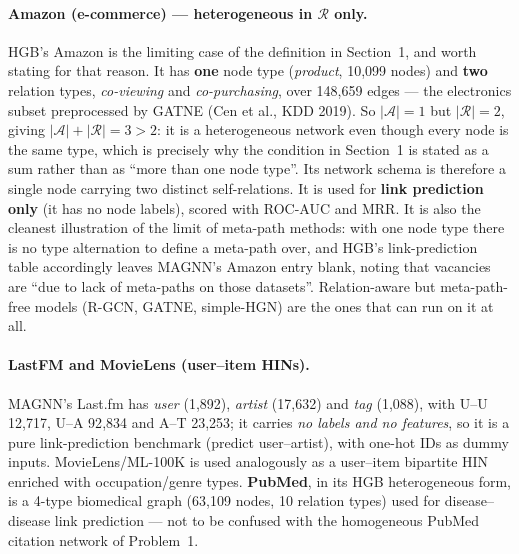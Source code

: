 \paragraph{Amazon (e-commerce) --- heterogeneous in $\mathcal{R}$ only.} HGB's Amazon is the
limiting case of the definition in Section~1, and worth stating for that reason. It has
\textbf{one} node type (\emph{product}, 10{,}099 nodes) and \textbf{two} relation types,
\emph{co-viewing} and \emph{co-purchasing}, over 148{,}659 edges --- the electronics subset
preprocessed by GATNE (Cen et al., KDD 2019). So $|\mathcal{A}|=1$ but $|\mathcal{R}|=2$, giving
$|\mathcal{A}|+|\mathcal{R}|=3>2$: it is a heterogeneous network even though every node is the
same type, which is precisely why the condition in Section~1 is stated as a sum rather than as
``more than one node type''. Its network schema is therefore a single node carrying two distinct
self-relations. It is used for \textbf{link prediction only} (it has no node labels), scored with
ROC-AUC and MRR. It is also the cleanest illustration of the limit of meta-path methods: with one
node type there is no type alternation to define a meta-path over, and HGB's link-prediction
table accordingly leaves MAGNN's Amazon entry blank, noting that vacancies are ``due to lack of
meta-paths on those datasets''. Relation-aware but meta-path-free models (R-GCN, GATNE,
simple-HGN) are the ones that can run on it at all.

\paragraph{LastFM and MovieLens (user--item HINs).} MAGNN's Last.fm has \emph{user} (1{,}892),
\emph{artist} (17{,}632) and \emph{tag} (1{,}088), with U--U 12{,}717, U--A 92{,}834 and A--T
23{,}253; it carries \emph{no labels and no features}, so it is a pure link-prediction benchmark
(predict user--artist), with one-hot IDs as dummy inputs. MovieLens/ML-100K is used analogously as
a user--item bipartite HIN enriched with occupation/genre types. \textbf{PubMed}, in its HGB
heterogeneous form, is a 4-type biomedical graph (63{,}109 nodes, 10 relation types) used for
disease--disease link prediction --- not to be confused with the homogeneous PubMed citation
network of Problem~1.

